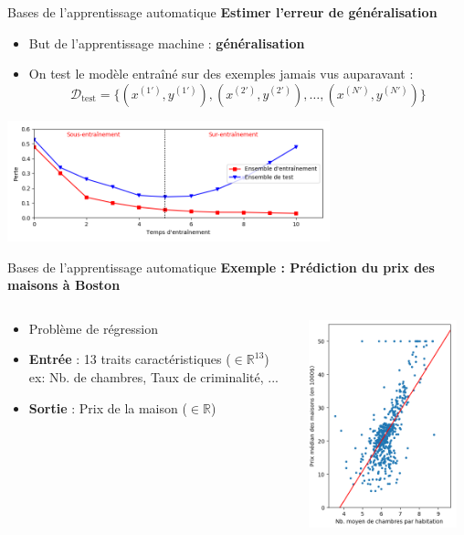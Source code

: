 \documentclass[french]{beamer}
\begin{document}
\begin{frame}{Bases de l'apprentissage automatique}
\textbf{Estimer l'erreur de généralisation}
\vspace{.5cm}
\begin{itemize}
	\item But de l'apprentissage machine : \textbf{généralisation}
	\item On test le modèle entraîné sur des exemples jamais vus auparavant :
	\vspace{-.2cm}
	$$\mathcal{D}_{\mathrm{test}} = \{ (x^{(1')}, y^{(1')}), (x^{(2')}, y^{(2')}), \dots, (x^{(N')}, y^{(N')}) \}$$
\end{itemize}
\begin{center}
\includegraphics[height=3.5cm]{figures/learning_curve}
\end{center}
\end{frame}

\begin{frame}{Bases de l'apprentissage automatique}
\textbf{Exemple : Prédiction du prix des maisons à Boston \cite{harrison1978hedonic}}
\vspace{0.5cm}
\begin{columns}[T] %
\begin{column}{.48\textwidth}
\begin{itemize}
	\item Problème de régression
	\item \textbf{Entrée} : 13 traits caractéristiques ($\in \mathbb{R}^{13}$)\\ ex: Nb. de chambres, Taux de criminalité, ...
	\item \textbf{Sortie} : Prix de la maison ($\in \mathbb{R}$)
\end{itemize}
\end{column}%
\hfill%
\begin{column}{.48\textwidth}
\centering
\includegraphics[height=6cm]{figures/boston}
\end{column}%
\end{columns}
\end{frame}
\end{document}
